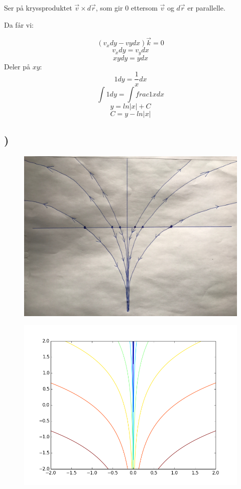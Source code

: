 \documentclass[a4paper,10pt,norsk]{article}
\begin{document}
Ser på kryssproduktet $\vec{v} \times d\vec{r}$, som gir 0 ettersom $\vec{v}$ og $d\vec{r}$ er parallelle.

Da får vi:

\[(v_{x}dy - vydx)\vec{k} = 0\]
\[v_{x}dy = v_{y}dx\]
\[xydy = ydx\]
Deler på $xy$:
\[1dy = \frac{1}{x}dx\]
\[\int 1 dy = \int frac{1}{x}dx\]
\[y = ln|x| + C\]
\[C = y - ln|x|\]

\subsection{)}

\begin{figure}[h!]
        \centering 
        \includegraphics[scale=0.2]{stromlinjer.jpg} 
\end{figure}



\begin{figure}[h!]
        \centering 
        \includegraphics[scale=0.6]{oppg2.png} 
\end{figure}
\end{document}
